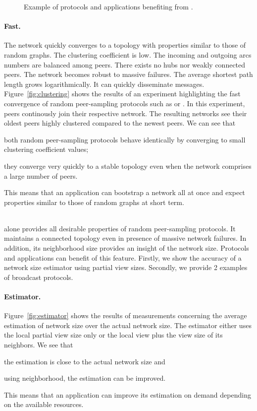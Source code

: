 \begin{figure}
\begin{center}
    \caption{Example of protocols and applications benefiting from \SPRAY.}
  \end{center}
\end{figure}






\paragraph{Fast.}
The network quickly converges to a topology with properties similar to those of
random graphs. The clustering coefficient is low. The incoming and outgoing arcs
numbers are balanced among peers. There exists no hubs nor weakly connected
peers. The network becomes robust to massive failures. The average shortest path
length grows logarithmically. It can quickly disseminate messages. \\
Figure~\ref{fig:clustering} shows the results of an experiment highlighting the
fast convergence of random peer-sampling protocols such as \SPRAY or \CYCLON. In
this experiment, peers continously join their respective network. The resulting
networks see their oldest peers highly clustered compared to the newest
peers. We can see that
\begin{inparaenum}[(i)]
\item both random peer-sampling protocols behave identically by converging to
  small clustering coefficient values;
\item they converge very quickly to a stable topology even when the network
  comprises a large number of peers.
\end{inparaenum}
This means that an application can bootstrap a network all at once and expect
properties similar to those of random graphs at short term.

\ \\ \indent \SPRAY alone provides all desirable properties of random peer-sampling
protocols. It maintains a connected topology even in presence of massive network
failures. In addition, its neighborhood size provides an insight of the network
size. Protocols and applications can benefit of this feature. Firstly, we show
the accuracy of a network size estimator using partial view sizes. Secondly, we
provide 2 examples of broadcast protocols.

\paragraph{Estimator.} Figure~\ref{fig:estimator} shows the results of
measurements concerning the average estimation of network size over the actual
network size. The estimator either uses the local partial view size only or the
local view plus the view size of its neighbors. We see that
\begin{inparaenum}[(i)]
\item the estimation is close to the actual network size and
\item using neighborhood, the estimation can be improved.
\end{inparaenum}
This means that an application can improve its estimation on demand depending on
the available resources.

